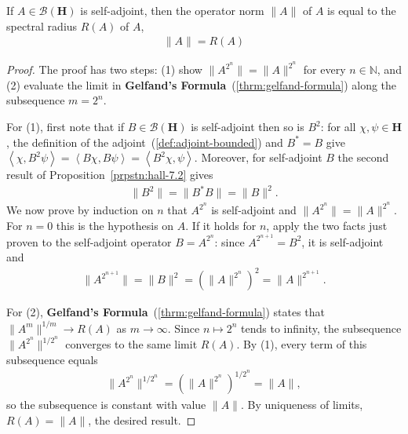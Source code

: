 \begin{lemma}
    \label{lmm:hall-8.1}
    \leanok
    If $A \in \mathcal{B}(\mathbf{H})$ is self-adjoint, then the operator norm $\|A\|$ of $A$ is equal to the spectral radius $R(A)$ of $A$,
    \begin{align}
        \|A\| = R(A)
    \end{align}
\end{lemma}
\begin{proof}
    \leanok
The proof has two steps: (1) show $\|A^{2^n}\| = \|A\|^{2^n}$ for every $n \in \mathbb{N}$, and (2) evaluate the limit in \textbf{Gelfand's Formula}~(\ref{thrm:gelfand-formula}) along the subsequence $m = 2^n$.

For (1), first note that if $B \in \mathcal{B}(\mathbf{H})$ is self-adjoint then so is $B^2$: for all $\chi, \psi \in \mathbf{H}$, the definition of the adjoint~(\ref{def:adjoint-bounded}) and $B^* = B$ give $\left< \chi, B^2 \psi \right> = \left< B\chi, B\psi \right> = \left< B^2 \chi, \psi \right>$. Moreover, for self-adjoint $B$ the second result of Proposition~\ref{prpstn:hall-7.2} gives
\begin{align}
    \|B^2\| = \|B^* B\| = \|B\|^2.
\end{align}
We now prove by induction on $n$ that $A^{2^n}$ is self-adjoint and $\|A^{2^n}\| = \|A\|^{2^n}$. For $n = 0$ this is the hypothesis on $A$. If it holds for $n$, apply the two facts just proven to the self-adjoint operator $B = A^{2^n}$: since $A^{2^{n+1}} = B^2$, it is self-adjoint and
\begin{align}
    \|A^{2^{n+1}}\| = \|B\|^2 = \left( \|A\|^{2^n} \right)^2 = \|A\|^{2^{n+1}}.
\end{align}

For (2), \textbf{Gelfand's Formula}~(\ref{thrm:gelfand-formula}) states that $\|A^m\|^{1/m} \rightarrow R(A)$ as $m \rightarrow \infty$. Since $n \mapsto 2^n$ tends to infinity, the subsequence $\|A^{2^n}\|^{1/2^n}$ converges to the same limit $R(A)$. By (1), every term of this subsequence equals
\begin{align}
    \|A^{2^n}\|^{1/2^n} = \left( \|A\|^{2^n} \right)^{1/2^n} = \|A\|,
\end{align}
so the subsequence is constant with value $\|A\|$. By uniqueness of limits, $R(A) = \|A\|$, the desired result.
\end{proof}

